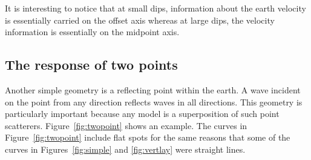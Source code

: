 \par
It is interesting to notice that at small dips,
information about the earth velocity is essentially carried
on the offset axis whereas at large dips,
the velocity information is essentially on the midpoint axis.

\subsection{The response of two points}
\par
Another simple geometry is a reflecting point within the earth.
A wave incident on the point from any direction
reflects waves in all directions.
This geometry is particularly important because
any model is a superposition of such point scatterers.
Figure~\ref{fig:twopoint} shows an example.
The curves in Figure~\ref{fig:twopoint}
include flat spots for the same reasons
that some of the curves in Figures~\ref{fig:simple} and \ref{fig:vertlay}
were straight lines.


